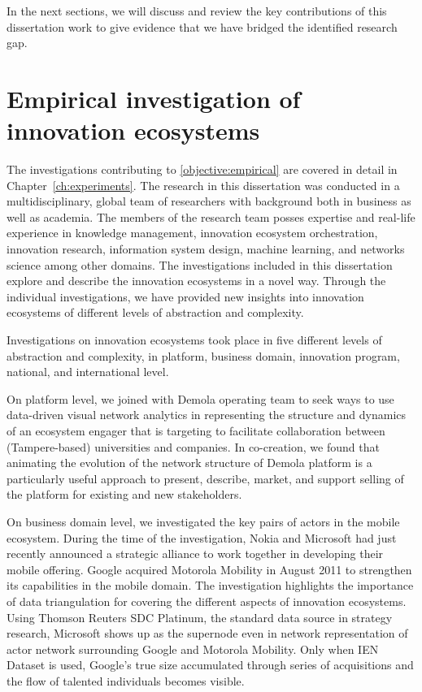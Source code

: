 In the next sections, we will discuss and review the key contributions of this dissertation work to give evidence that we have bridged the identified research gap. 

\section{Empirical investigation of innovation ecosystems}

The investigations contributing to \ref{objective:empirical} are covered in detail in Chapter~\ref{ch:experiments}. The research in this dissertation was conducted in a multidisciplinary, global team of researchers with background both in business as well as academia. The members of the research team posses expertise and real-life experience in knowledge management, innovation ecosystem orchestration, innovation research, information system design, machine learning, and networks science among other domains. The investigations included in this dissertation explore and describe the innovation ecosystems in a novel way. Through the individual investigations, we have provided new insights into innovation ecosystems of different levels of abstraction and complexity.

Investigations on innovation ecosystems took place in five different levels of abstraction and complexity, in  platform, business domain, innovation program, national, and international level.

On platform level, we joined with Demola operating team to seek ways to use data-driven visual network analytics in representing the structure and dynamics of an ecosystem engager that is targeting to facilitate collaboration between (Tampere-based) universities and companies. In co-creation, we found that animating the evolution of the network structure of Demola platform is a particularly useful approach to present, describe, market, and support selling of the platform for existing and new stakeholders.

On business domain level, we investigated the key pairs of actors in the mobile ecosystem. During the time of the investigation, Nokia and Microsoft had just recently announced a strategic alliance to work together in developing their mobile offering. Google acquired Motorola Mobility in August 2011 to strengthen its capabilities in the mobile domain. The investigation highlights the importance of data triangulation for covering the different aspects of innovation ecosystems. Using Thomson Reuters SDC Platinum, the standard data source in strategy research, Microsoft shows up as the supernode even in network representation of actor network surrounding Google and Motorola Mobility. Only when IEN Dataset is used, Google’s true size accumulated through series of acquisitions and the flow of talented individuals becomes visible.

